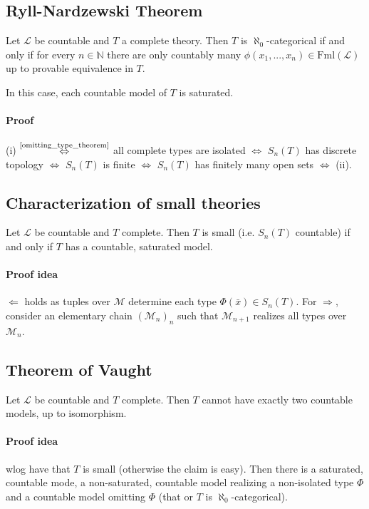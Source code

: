 \documentclass{scrartcl}
\newcommand{\N}{\mathbb{N}}
\begin{document}
\subsection{Ryll-Nardzewski Theorem}
\label{ryll_nardzewski}
Let $\mathcal{L}$ be countable and $T$ a complete theory. 
Then $T$ is $\aleph_0$-categorical if and only if for every $n \in \N$ there are only countably many $\phi(x_1, ..., x_n) \in \mathrm{Fml}(\mathcal{L})$ up to provable equivalence in $T$.

In this case, each countable model of $T$ is saturated.
\paragraph{Proof} (i) $\overset{\text{\ref{omitting_type_theorem}}}{\Leftrightarrow}$ all complete types are isolated $\Leftrightarrow$ $S_n(T)$ has discrete topology $\Leftrightarrow$ $S_n(T)$ is finite $\Leftrightarrow$ $S_n(T)$ has finitely many open sets $\Leftrightarrow$ (ii).

\subsection{Characterization of small theories}
Let $\mathcal{L}$ be countable and $T$ complete. Then $T$ is small (i.e. $S_n(T)$ countable) if and only if $T$ has a countable, saturated model.
\paragraph{Proof idea} $\Leftarrow$ holds as tuples over $\mathcal{M}$ determine each type $\Phi(\bar{x}) \in S_n(T)$. 
For $\Rightarrow$, consider an elementary chain $(\mathcal{M}_n)_n$ such that $\mathcal{M}_{n + 1}$ realizes all types over $\mathcal{M}_n$.

\subsection{Theorem of Vaught}
Let $\mathcal{L}$ be countable and $T$ complete. Then $T$ cannot have exactly two countable models, up to isomorphism.
\paragraph{Proof idea} wlog have that $T$ is small (otherwise the claim is easy). 
Then there is a saturated, countable mode, a non-saturated, countable model realizing a non-isolated type $\Phi$ and a countable model omitting $\Phi$ (that or $T$ is $\aleph_0$-categorical).
\end{document}
